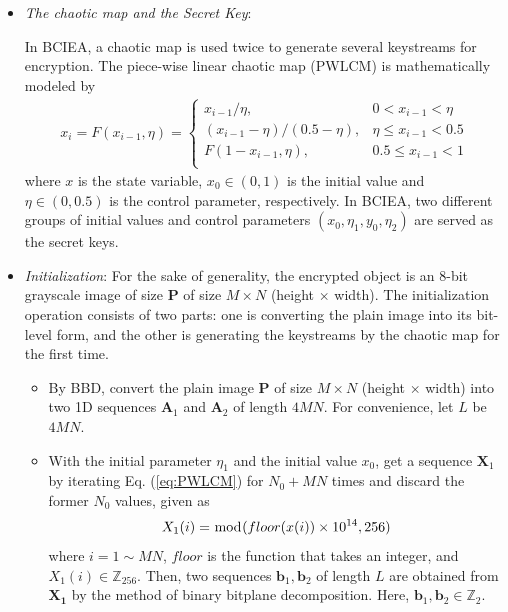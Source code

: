 \documentclass[final,3p,times,twocolumn]{elsarticle}
\begin{document}
\begin{itemize}
	
	\item \emph{The chaotic map and the Secret Key}:
	
	In BCIEA, a chaotic map is used twice to generate several keystreams for encryption. The piece-wise linear chaotic map (PWLCM) is mathematically modeled by
	\begin{equation}
	\begin{aligned}
	x_i = F(x_{i-1},\eta)=	\begin{cases}
	x_{i-1}/ \eta,              & 0<x_{i-1}<\eta \\
	(x_{i-1}- \eta)/(0.5-\eta), & \eta \le x_{i-1}<0.5 \\
	F(1-x_{i-1},\eta),          & 0.5 \le x_{i-1}<1 \\
	\end{cases}
	\end{aligned}
	\label{eq:PWLCM}
	\end{equation}
	where $x$ is the state variable, $x_0 \in (0,1)$ is the initial value and $\eta \in (0,0.5)$ is the control parameter, respectively. In BCIEA, two different groups of  initial values and control parameters $(x_0,\eta_1,y_0,\eta_2)$ are served as the secret keys.
	
	\item \emph{Initialization}:
	For the sake of generality, the encrypted object is an 8-bit grayscale image of size $\bm{P}$ of size $M \times N$ (height $\times$ width). The initialization operation consists of two parts: one is converting the plain image into its bit-level form, and the other is generating the keystreams by the chaotic map for the first time.
	\begin{itemize}
		\item By BBD, convert the plain image $\bm{P}$ of size $M \times N$ (height $\times$ width) into two 1D sequences $\bm{A}_1$ and $\bm{A}_2$ of length $4MN$. For convenience, let $L$ be $4MN$.
		\item With the initial parameter $\eta_1$ and the initial value $x_0$, get a sequence $\bm{X}_1$ by iterating Eq. (\ref{eq:PWLCM}) for $N_0+MN$ times and discard the former $N_0$ values, given as
		\begin{equation*}
		X_1(i) = \bmod(floor(x(i))\times 10^{14},256)\\
		\label{eq:PRNS}
		\end{equation*}
		where $i =1 \sim MN$, $floor$ is the function that takes an integer, and $X_1(i) \in \mathbb{Z}_{256}$. Then, two sequences $\bm{b}_1,\bm{b}_2$ of length $L$ are obtained from $\bm{X_1}$ by the method of binary bitplane decomposition. Here, $\bm{b}_1,\bm{b}_2 \in \mathbb{Z}_{2}$.
	\end{itemize}
	

\end{itemize}
\end{document}
